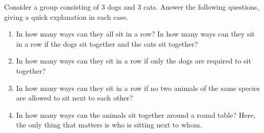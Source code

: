 \documentclass{article}
\theoremstyle{definition}
\begin{document}
\begin{question}
Consider a group consisting of 3 dogs and 3 cats. Answer the following questions, giving a quick explanation in each case.

\begin{enumerate}
	\item In how many ways can they all sit in a row? In how many ways can they sit in a row if the dogs sit together and the cats sit together?
	\item In how many ways can they sit in a row if only the dogs are required to sit together?
	\item In how many ways can they sit in a row if no two animals of the same species are allowed to sit next to each other?
	\item In how many ways can the animals sit together around a round table? Here, the only thing that matters is who is sitting next to whom.
\end{enumerate}
\end{question}
\end{document}

